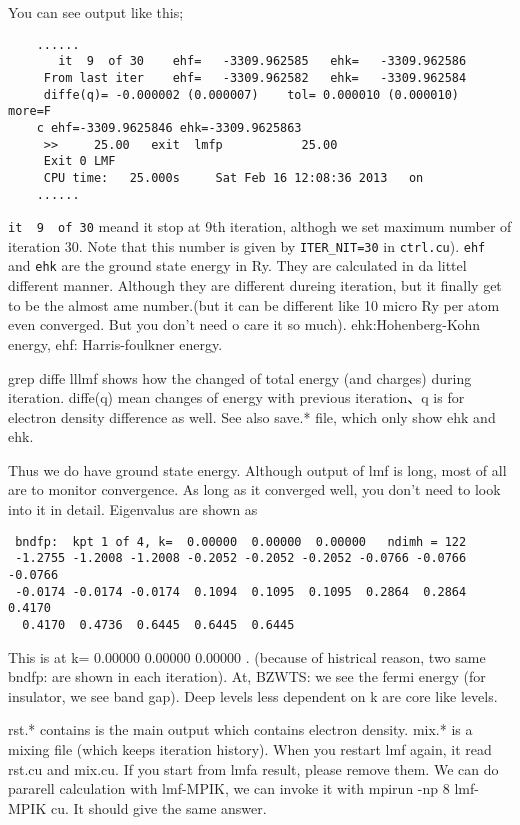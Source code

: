 \documentclass[a4paper,10pt,epsf,fleqn]{article}
\begin{document}
You can see output like this;
\begin{verbatim}
    ......
       it  9  of 30    ehf=   -3309.962585   ehk=   -3309.962586
     From last iter    ehf=   -3309.962582   ehk=   -3309.962584
     diffe(q)= -0.000002 (0.000007)    tol= 0.000010 (0.000010)   more=F
    c ehf=-3309.9625846 ehk=-3309.9625863
     >>     25.00   exit  lmfp           25.00
     Exit 0 LMF 
     CPU time:   25.000s     Sat Feb 16 12:08:36 2013   on  
    ......
\end{verbatim}
\verb+it  9  of 30+ meand it stop at 9th iteration, althogh we set
maximum number of iteration 30. Note that this number is 
given by \verb+ITER_NIT=30+ in \verb+ctrl.cu+).
\verb+ehf+ and \verb+ehk+ are the ground state energy in Ry.
They are calculated in da littel different manner. Although
they are different dureing iteration, but it finally get to be the
almost ame number.(but it can be different like 10 micro Ry per atom
even converged. But you don't need o care it so much).
ehk:Hohenberg-Kohn energy, ehf: Harris-foulkner energy.

grep diffe lllmf shows how the changed of total energy (and charges)
during iteration. diffe(q) mean  changes of energy with previous
iteration、q is for electron density difference as well.
See also save.* file, which only show ehk and ehk.

Thus we do have ground state energy.
Although output of lmf is long, most of all are to monitor
convergence.
As long as it converged well, you don't need to look into it in detail.
Eigenvalus are shown as
\begin{verbatim}
 bndfp:  kpt 1 of 4, k=  0.00000  0.00000  0.00000   ndimh = 122
 -1.2755 -1.2008 -1.2008 -0.2052 -0.2052 -0.2052 -0.0766 -0.0766 -0.0766
 -0.0174 -0.0174 -0.0174  0.1094  0.1095  0.1095  0.2864  0.2864  0.4170
  0.4170  0.4736  0.6445  0.6445  0.6445
\end{verbatim}
This is at k=  0.00000  0.00000  0.00000 .
(because of histrical reason, two same bndfp: are shown in each iteration).
At, BZWTS: we see the fermi energy (for insulator, we see band gap).
Deep levels less dependent on k are core like levels.


rst.* contains is the main output which contains electron density.
mix.* is a mixing file (which keeps iteration history).
When you restart lmf again, it read rst.cu and mix.cu.
If you start from lmfa result, please remove them.
We can do pararell calculation with lmf-MPIK, 
we can invoke it with mpirun -np 8 lmf-MPIK cu. It should give the
same answer.
\end{document}
